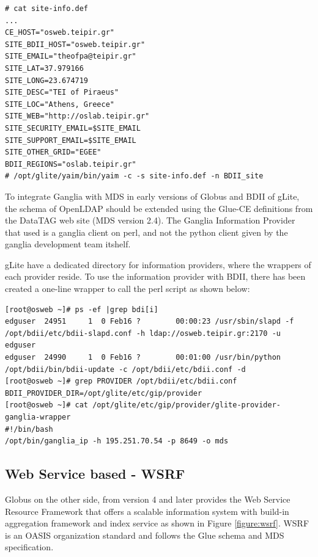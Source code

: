 \begin{lstlisting}
# cat site-info.def
...
CE_HOST="osweb.teipir.gr"
SITE_BDII_HOST="osweb.teipir.gr"
SITE_EMAIL="theofpa@teipir.gr"
SITE_LAT=37.979166
SITE_LONG=23.674719
SITE_DESC="TEI of Piraeus"
SITE_LOC="Athens, Greece"
SITE_WEB="http://oslab.teipir.gr"
SITE_SECURITY_EMAIL=$SITE_EMAIL
SITE_SUPPORT_EMAIL=$SITE_EMAIL
SITE_OTHER_GRID="EGEE"
BDII_REGIONS="oslab.teipir.gr"
# /opt/glite/yaim/bin/yaim -c -s site-info.def -n BDII_site
\end{lstlisting}

To integrate Ganglia with MDS in early versions of Globus and BDII of gLite, the schema of OpenLDAP should be extended using the Glue-CE definitions from the DataTAG web site (MDS version 2.4). The Ganglia Information Provider that used is a ganglia client on perl, and not the python client given by the ganglia development team itshelf.

gLite have a dedicated directory for information providers, where the wrappers of each provider reside. To use the information provider with BDII, there has been created a one-line wrapper to call the perl script as shown below:

\begin{lstlisting}
[root@osweb ~]# ps -ef |grep bdi[i]
edguser  24951     1  0 Feb16 ?        00:00:23 /usr/sbin/slapd -f /opt/bdii/etc/bdii-slapd.conf -h ldap://osweb.teipir.gr:2170 -u edguser
edguser  24990     1  0 Feb16 ?        00:01:00 /usr/bin/python /opt/bdii/bin/bdii-update -c /opt/bdii/etc/bdii.conf -d
[root@osweb ~]# grep PROVIDER /opt/bdii/etc/bdii.conf
BDII_PROVIDER_DIR=/opt/glite/etc/gip/provider
[root@osweb ~]# cat /opt/glite/etc/gip/provider/glite-provider-ganglia-wrapper
#!/bin/bash
/opt/bin/ganglia_ip -h 195.251.70.54 -p 8649 -o mds
\end{lstlisting}

\subsection{Web Service based - WSRF}

Globus on the other side, from version 4 and later provides the Web Service Resource Framework that offers a scalable information system with build-in aggregation framework and index service as shown in Figure \ref{figure:wsrf}. WSRF is an OASIS organization standard and follows the Glue schema and MDS specification.

